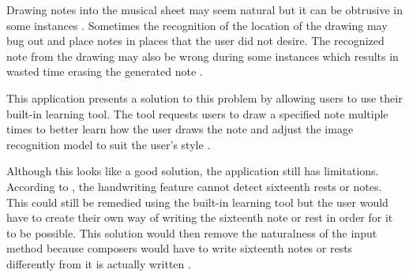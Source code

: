         
        Drawing notes into the musical sheet may seem natural but it can be obtrusive in some instances \citep{macdonald2017komp}. Sometimes the recognition of the location of the drawing may bug out and place notes in places that the user did not desire. The recognized note from the drawing may also be wrong during some instances which results in wasted time erasing the generated note \citep{macdonald2017komp}. 
        
        This application presents a solution to this problem by allowing users to use their built-in learning tool. The tool requests users to draw a specified note multiple times to better learn how the user draws the note and adjust the image recognition model to suit the user's style \citep{macdonald2017komp}. 
        
        Although this looks like a good solution, the application still has limitations. According to \citet{macdonald2017komp}, the handwriting feature cannot detect sixteenth rests or notes. This could still be remedied using the built-in learning tool but the user would have to create their own way of writing the sixteenth note or rest in order for it to be possible. This solution would then remove the naturalness of the input method because composers would have to write sixteenth notes or rests differently from it is actually written \citep{macdonald2017komp}.
        
        
